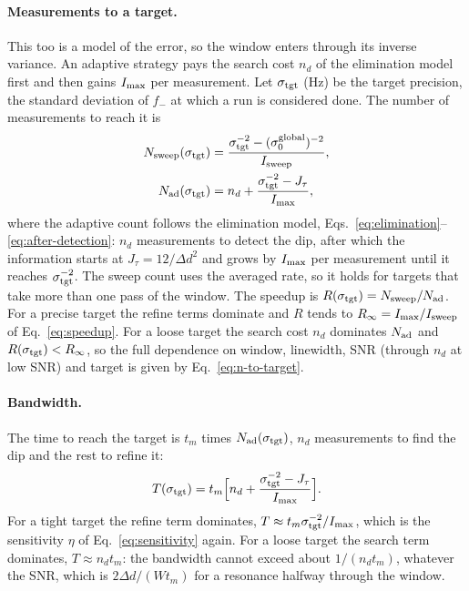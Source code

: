 \paragraph{Measurements to a target.} This too is a model of the error, so the window enters through its inverse
variance. An adaptive strategy pays the search cost $n_d$ of the elimination model first and then gains
$I_{\rm max}$ per measurement. Let $\sigma_{\rm tgt}$ (Hz) be the target precision, the standard deviation of $f_-$ at
which a run is considered done. The number of measurements to reach it is
\begin{equation}
  \begin{aligned}
  N_{\rm sweep}(\sigma_{\rm tgt})&=\frac{\sigma_{\rm tgt}^{-2}-(\sigma_0^{\rm global})^{-2}}{I_{\rm sweep}},\\
  N_{\rm ad}(\sigma_{\rm tgt})&=n_d+\frac{\sigma_{\rm tgt}^{-2}-J_\tau}{I_{\rm max}},
  \end{aligned}
  \label{eq:n-to-target}
\end{equation}
where the adaptive count follows the elimination model, Eqs.~\eqref{eq:elimination}--\eqref{eq:after-detection}:
$n_d$ measurements to detect the dip, after which the information starts at $J_\tau=12/\Delta d^2$ and grows by
$I_{\rm max}$ per measurement until it reaches $\sigma_{\rm tgt}^{-2}$. The sweep count uses the averaged rate, so it
holds for targets that take more than one pass of the window. The speedup is
$R(\sigma_{\rm tgt})=N_{\rm sweep}/N_{\rm ad}$. For a precise target the refine terms dominate and $R$ tends to
$R_\infty=I_{\rm max}/I_{\rm sweep}$ of Eq.~\eqref{eq:speedup}. For a loose target the search cost $n_d$ dominates
$N_{\rm ad}$ and $R(\sigma_{\rm tgt})<R_\infty$, so the full dependence on window, linewidth, SNR (through $n_d$ at
low SNR) and target is given by Eq.~\eqref{eq:n-to-target}.

\paragraph{Bandwidth.} The time to reach the target is $t_m$ times $N_{\rm ad}(\sigma_{\rm tgt})$, $n_d$ measurements
to find the dip and the rest to refine it:
\begin{equation}
  T(\sigma_{\rm tgt})=t_m\Big[n_d+\frac{\sigma_{\rm tgt}^{-2}-J_\tau}{I_{\rm max}}\Big].
  \label{eq:bandwidth}
\end{equation}
For a tight target the refine term dominates, $T\approx t_m\sigma_{\rm tgt}^{-2}/I_{\rm max}$, which is the sensitivity
$\eta$ of Eq.~\eqref{eq:sensitivity} again. For a loose target the search term dominates, $T\approx n_d t_m$: the
bandwidth cannot exceed about $1/(n_d t_m)$, whatever the SNR, which is $2\Delta d/(W t_m)$ for a resonance halfway
through the window.

